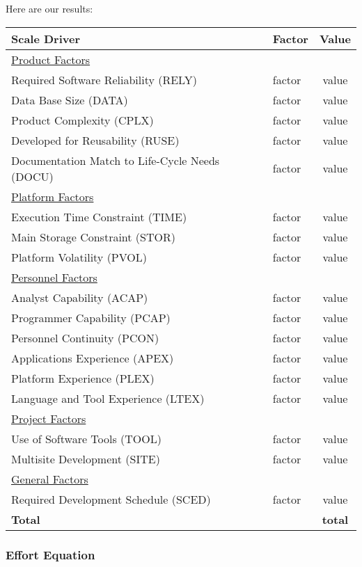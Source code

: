 \pagebreak
Here are our results:
\begin{center}
	\begin{tabular}{l l c}
		\hline
		\textbf{Scale Driver} & \textbf{Factor} & \textbf{Value} \\
		\hline \hline
		\underline{Product Factors} & & \\
		Required Software Reliability (RELY) & factor & value \\
		Data Base Size (DATA) & factor & value \\
		Product Complexity (CPLX) & factor & value \\
		Developed for Reusability (RUSE) & factor & value \\
		Documentation Match to Life-Cycle Needs (DOCU) & factor & value \\
		\hline
		\underline{Platform Factors} & & \\
		Execution Time Constraint (TIME) & factor & value \\
		Main Storage Constraint (STOR) & factor & value \\
		Platform Volatility (PVOL) & factor & value \\
		\hline
		\underline{Personnel Factors} & & \\
		Analyst Capability (ACAP) & factor & value \\
		Programmer Capability (PCAP) & factor & value \\
		Personnel Continuity (PCON) & factor & value \\
		Applications Experience (APEX) & factor & value \\
		Platform Experience (PLEX) & factor & value \\
		Language and Tool Experience (LTEX) & factor & value \\
		\hline
		\underline{Project Factors} & & \\
		Use of Software Tools (TOOL) & factor & value \\
		Multisite Development (SITE) & factor & value \\
		\hline
		\underline{General Factors} & & \\
		Required Development Schedule (SCED) & factor & value \\
		\hline \hline
		\textbf{Total} & & \textbf{total} \\
		\hline
	\end{tabular}
\end{center}

\pagebreak
\subsubsection{Effort Equation}

